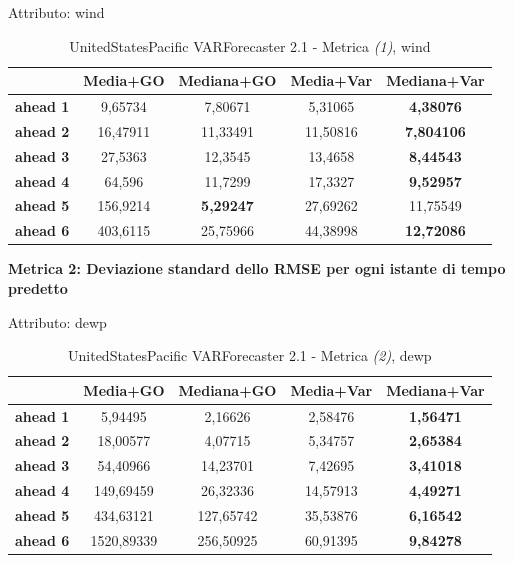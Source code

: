 \documentclass[12pt,a4paper,oneside,openright]{book}
\begin{document}
\medskip

Attributo: wind \\ 

\begin{table}[H]
\centering
\begin{tabular}{|c|c|c|c|c|}
\hline
 & \textbf{Media+GO} & \textbf{Mediana+GO} & \textbf{Media+Var} & \textbf{Mediana+Var} \\
\hline
\textbf{ahead 1} & 9,65734 & 7,80671 & 5,31065 & \textbf{4,38076} \\
\hline
\textbf{ahead 2} & 16,47911 & 11,33491 & 11,50816 & \textbf{7,804106} \\
\hline
\textbf{ahead 3} & 27,5363 & 12,3545 & 13,4658 & \textbf{8,44543} \\
\hline
\textbf{ahead 4} & 64,596 & 11,7299 & 17,3327 & \textbf{9,52957} \\
\hline
\textbf{ahead 5} & 156,9214 & \textbf{5,29247} & 27,69262 & 11,75549 \\
\hline
\textbf{ahead 6} & 403,6115 & 25,75966 & 44,38998 & \textbf{12,72086} \\
\hline
\end{tabular}
\caption{UnitedStatesPacific VARForecaster 2.1 - Metrica \textit{(1)}, wind}
\end{table}
\newpage

\textbf{Metrica 2: Deviazione standard dello RMSE per ogni istante di tempo predetto}

\medskip


Attributo: dewp \\

\begin{table}[H]
\centering
\begin{tabular}{|c|c|c|c|c|}
\hline
 & \textbf{Media+GO} & \textbf{Mediana+GO} & \textbf{Media+Var} & \textbf{Mediana+Var} \\
\hline
\textbf{ahead 1} & 5,94495 & 2,16626 & 2,58476 & \textbf{1,56471} \\
\hline
\textbf{ahead 2} & 18,00577 & 4,07715 & 5,34757 & \textbf{2,65384} \\
\hline
\textbf{ahead 3} & 54,40966 & 14,23701 & 7,42695 & \textbf{3,41018} \\
\hline
\textbf{ahead 4} & 149,69459 & 26,32336 & 14,57913 & \textbf{4,49271} \\
\hline
\textbf{ahead 5} & 434,63121 & 127,65742 & 35,53876 & \textbf{6,16542} \\
\hline
\textbf{ahead 6} & 1520,89339 & 256,50925 & 60,91395 & \textbf{9,84278} \\
\hline
\end{tabular} \\
\caption{UnitedStatesPacific VARForecaster 2.1 - Metrica \textit{(2)}, dewp}
\end{table}
\end{document}
